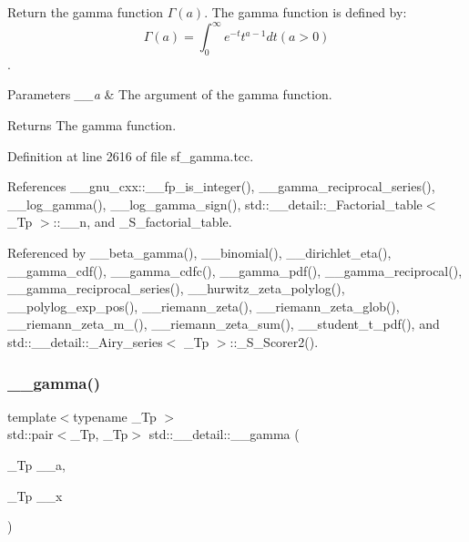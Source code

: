 Return the gamma function $ \Gamma(a) $. The gamma function is defined by\+: \[ \Gamma(a) = \int_0^\infty e^{-t}t^{a-1}dt (a > 0) \]. 


\begin{DoxyParams}{Parameters}
{\em \+\_\+\+\_\+a} & The argument of the gamma function. \\
\hline
\end{DoxyParams}
\begin{DoxyReturn}{Returns}
The gamma function. 
\end{DoxyReturn}


Definition at line 2616 of file sf\+\_\+gamma.\+tcc.



References \+\_\+\+\_\+gnu\+\_\+cxx\+::\+\_\+\+\_\+fp\+\_\+is\+\_\+integer(), \+\_\+\+\_\+gamma\+\_\+reciprocal\+\_\+series(), \+\_\+\+\_\+log\+\_\+gamma(), \+\_\+\+\_\+log\+\_\+gamma\+\_\+sign(), std\+::\+\_\+\+\_\+detail\+::\+\_\+\+Factorial\+\_\+table$<$ \+\_\+\+Tp $>$\+::\+\_\+\+\_\+n, and \+\_\+\+S\+\_\+factorial\+\_\+table.



Referenced by \+\_\+\+\_\+beta\+\_\+gamma(), \+\_\+\+\_\+binomial(), \+\_\+\+\_\+dirichlet\+\_\+eta(), \+\_\+\+\_\+gamma\+\_\+cdf(), \+\_\+\+\_\+gamma\+\_\+cdfc(), \+\_\+\+\_\+gamma\+\_\+pdf(), \+\_\+\+\_\+gamma\+\_\+reciprocal(), \+\_\+\+\_\+gamma\+\_\+reciprocal\+\_\+series(), \+\_\+\+\_\+hurwitz\+\_\+zeta\+\_\+polylog(), \+\_\+\+\_\+polylog\+\_\+exp\+\_\+pos(), \+\_\+\+\_\+riemann\+\_\+zeta(), \+\_\+\+\_\+riemann\+\_\+zeta\+\_\+glob(), \+\_\+\+\_\+riemann\+\_\+zeta\+\_\+m\+\_(), \+\_\+\+\_\+riemann\+\_\+zeta\+\_\+sum(), \+\_\+\+\_\+student\+\_\+t\+\_\+pdf(), and std\+::\+\_\+\+\_\+detail\+::\+\_\+\+Airy\+\_\+series$<$ \+\_\+\+Tp $>$\+::\+\_\+\+S\+\_\+\+Scorer2().

\mbox{\label{namespacestd_1_1____detail_a00ade496acee116fb7990d20ff4be762}} 
\subsubsection{\texorpdfstring{\+\_\+\+\_\+gamma()}{\_\_gamma()}\hspace{0.1cm}{\footnotesize\ttfamily [2/2]}}
{\footnotesize\ttfamily template$<$typename \+\_\+\+Tp $>$ \\
std\+::pair$<$\+\_\+\+Tp, \+\_\+\+Tp$>$ std\+::\+\_\+\+\_\+detail\+::\+\_\+\+\_\+gamma (\begin{DoxyParamCaption}\item[{\+\_\+\+Tp}]{\+\_\+\+\_\+a,  }\item[{\+\_\+\+Tp}]{\+\_\+\+\_\+x }\end{DoxyParamCaption})}



